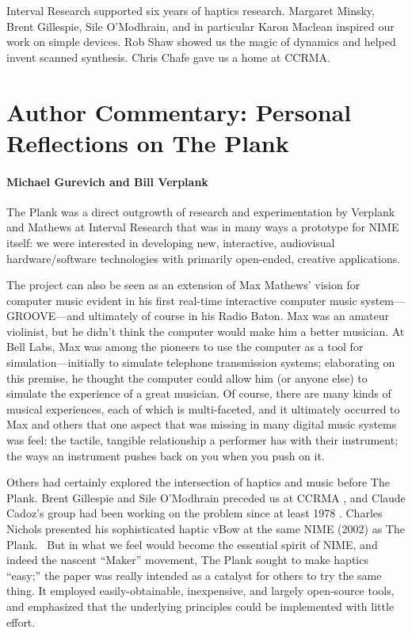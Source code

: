 \begin{acknowledgement}
Interval Research supported six years of haptics research. Margaret Minsky, Brent Gillespie, Sile O'Modhrain, and in particular Karon Maclean inspired our work on simple devices. Rob Shaw showed us the magic of dynamics and helped invent scanned synthesis. Chris Chafe gave us a home at CCRMA.
\end{acknowledgement}

\section*{Author Commentary: Personal Reflections on The Plank}
\paragraph{Michael Gurevich and Bill Verplank}

The Plank was a direct outgrowth of research and experimentation by Verplank and Mathews at Interval Research that was in many ways a prototype for NIME itself: we were interested in developing new, interactive, audiovisual hardware/software technologies with primarily open-ended, creative applications.

The project can also be seen as an extension of Max Mathews' vision for computer music evident in his first real-time interactive computer music system---GROOVE---and ultimately of course in his Radio Baton. Max was an amateur violinist, but he didn't think the computer would make him a better musician. At Bell Labs, Max was among the pioneers to use the computer as a tool for simulation---initially to simulate telephone transmission systems; elaborating on this premise, he thought the computer could allow him (or anyone else) to simulate the experience of a great musician. Of course, there are many kinds of musical experiences, each of which is multi-faceted, and it ultimately occurred to Max and others that one aspect that was missing in many digital music systems was feel: the tactile, tangible relationship a performer has with their instrument; the ways an instrument pushes back on you when you push on it.

Others had certainly explored the intersection of haptics and music before The Plank. Brent Gillespie and Sile O'Modhrain preceded us at CCRMA \cite{Gillespie:1995}, and Claude Cadoz's group had been working on the problem since at least 1978 \cite{Cadoz:2003}. Charles Nichols presented his sophisticated haptic vBow at the same NIME (2002) as The Plank.  But in what we feel would become the essential spirit of NIME, and indeed the nascent ``Maker'' movement, The Plank sought to make haptics ``easy;'' the paper was really intended as a catalyst for others to try the same thing. It employed easily-obtainable, inexpensive, and largely open-source tools, and emphasized that the underlying principles could be implemented with little effort. 


